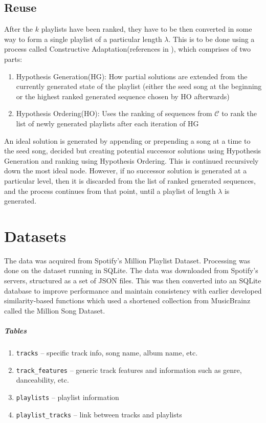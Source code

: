 \documentclass[a4paper, 12pt]{report}
\begin{document}
\section{Reuse}
After the \(k\) playlists have been ranked, they have to be then converted in some way to form a single playlist of a particular length \(\lambda\). 
This is to be done using a process called Constructive Adaptation(references \cite{constructive-adaptation} in \cite{main}), which comprises of two parts:
\begin{enumerate}
    \item Hypothesis Generation(HG): How partial solutions are extended from the currently generated state of the playlist 
    (either the seed song at the beginning or the highest ranked generated sequence chosen by HO afterwards)
    \item Hypothesis Ordering(HO): Uses the ranking of sequences from \(\mathcal{C}\) to rank the list of newly generated playlists after each iteration of HG
\end{enumerate}
An ideal solution is generated by appending or prepending a song at a time to the seed song, decided but creating potential successor 
solutions using Hypothesis Generation and ranking using Hypothesis Ordering. 
This is continued recursively down the most ideal node. However, if no successor solution is generated at a particular level, then it is discarded from the 
list of ranked generated sequences, and the process continues from that point, until a playlist of length \(\lambda\) is generated.



\chapter{Datasets}
The data was acquired from Spotify's Million Playlist Dataset.
Processing was done on the dataset running in SQLite.
The data was downloaded from Spotify's servers, structured as a set of JSON files.
This was then converted into an SQLite database to improve performance and maintain consistency with earlier developed similarity-based 
functions which used a shortened collection from MusicBrainz called the Million Song Dataset.

\paragraph*{Tables}
\begin{enumerate}
    \item \texttt{tracks} -- specific track info, song name, album name, etc.
    \item \texttt{track\_features} -- generic track features and information such as genre, danceability, etc.
    \item \texttt{playlists} -- playlist information
    \item \texttt{playlist\_tracks} -- link between tracks and playlists
\end{enumerate}
\end{document}
